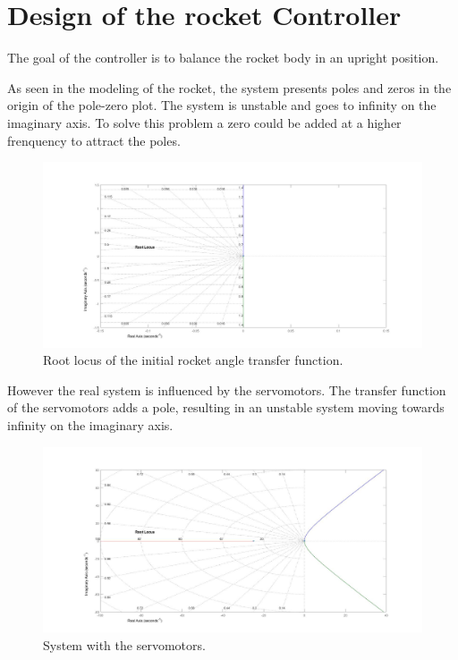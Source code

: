 \graphicspath{{figures/Design/IPController/}}
\chapter{Design of the rocket Controller}\label{sec:IPController}
The goal of the controller is to balance the rocket body in an upright position. 

As seen in the modeling of the rocket, the system presents poles and zeros in the origin of the pole-zero plot. The system is unstable and goes to infinity on the imaginary axis. To solve this problem a zero could be added at a higher frenquency to attract the poles.

\begin{figure}[htbp]
	\centering
	
		\includegraphics[width=\textwidth]{figures/Rocket/design/initial_transfer_function}
		\caption{Root locus of the initial rocket angle transfer function.}
		\label{fig:Rinitialtf}
	
\end{figure}

However the real system is influenced by the servomotors. The transfer function of the servomotors adds a pole, resulting in an unstable system moving towards infinity on the imaginary axis. 
				
\begin{figure}[htbp]
	\centering
		\includegraphics[width=\textwidth]{figures/Rocket/design/tf_with_servo}
		\caption{System with the servomotors.}
		\label{fig:SystemServo}
\end{figure}

